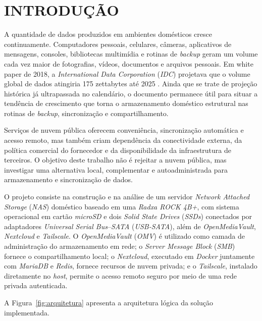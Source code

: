 
\chapter{INTRODUÇÃO}
\label{cap:introducao}

A quantidade de dados produzidos em ambientes domésticos cresce continuamente. Computadores pessoais, celulares, câmeras, aplicativos de mensagens, consoles, bibliotecas multimídia e rotinas de \textit{backup} geram um volume cada vez maior de fotografias, vídeos, documentos e arquivos pessoais. Em white paper de 2018, a \textit{International Data Corporation} (\textit{IDC}) projetava que o volume global de dados atingiria 175 zettabytes até 2025 \cite{reinsel2018}. Ainda que se trate de projeção histórica já ultrapassada no calendário, o documento permanece útil para situar a tendência de crescimento que torna o armazenamento doméstico estrutural nas rotinas de \textit{backup}, sincronização e compartilhamento.

Serviços de nuvem pública oferecem conveniência, sincronização automática e acesso remoto, mas também criam dependência da conectividade externa, da política comercial do fornecedor e da disponibilidade da infraestrutura de terceiros. O objetivo deste trabalho não é rejeitar a nuvem pública, mas investigar uma alternativa local, complementar e autoadministrada para armazenamento e sincronização de dados.

O projeto consiste na construção e na análise de um servidor \textit{Network Attached Storage} (\textit{NAS}) doméstico baseado em uma \textit{Radxa ROCK 4B+}, com sistema operacional em cartão \textit{microSD} e dois \textit{Solid State Drives} (\textit{SSDs}) conectados por adaptadores \textit{Universal Serial Bus}--\textit{SATA} (\textit{USB-SATA}), além de \textit{OpenMediaVault}, \textit{Nextcloud} e \textit{Tailscale}. O \textit{OpenMediaVault} (\textit{OMV}) é utilizado como camada de administração do armazenamento em rede; o \textit{Server Message Block} (\textit{SMB}) fornece o compartilhamento local; o \textit{Nextcloud}, executado em \textit{Docker} juntamente com \textit{MariaDB} e \textit{Redis}, fornece recursos de nuvem privada; e o \textit{Tailscale}, instalado diretamente no \textit{host}, permite o acesso remoto seguro por meio de uma rede privada autenticada.

A Figura~\ref{fig:arquitetura} apresenta a arquitetura lógica da solução implementada.

